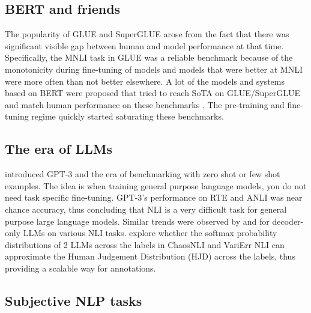\subsection{BERT and friends}
\label{related:mlms}
The popularity of GLUE \citep{wang2019glue} and SuperGLUE \citep{wang2019superglue} arose from the fact that there was significant visible gap between human and model performance at that time. Specifically, the MNLI task in GLUE was a reliable benchmark because of the monotonicity during fine-tuning of models and models that were better at MNLI were more often than not better elsewhere. A lot of the models and systems based on BERT \citep{devlin2019bert} were proposed that tried to reach SoTA on GLUE/SuperGLUE and match human performance on these benchmarks \citep{he2021deberta,he2021debertav3,patra2022englishcentric}. The pre-training and fine-tuning regime quickly started saturating these benchmarks.

\subsection{The era of LLMs}
\label{related:llms}
\citet{brown2020language} introduced GPT-3 and the era of benchmarking with zero shot or few shot examples. The idea is when training general purpose language models, you do not need task specific fine-tuning. GPT-3's performance on RTE and ANLI was near chance accuracy, thus concluding that NLI is a very difficult task for general purpose large language models. Similar trends were observed by \citet{ohmer2024form} and \citet{weber-etal-2023-mind} for decoder-only LLMs on various NLI tasks. \citet{chen2024seeingbig} explore whether the softmax probability distributions of 2 LLMs across the labels in ChaosNLI \citep{nie-etal-2020-learn} and VariErr NLI \citep{weber-genzel-etal-2024-varierr} can approximate the Human Judgement Distribution (HJD) across the labels, thus providing a scalable way for annotations.

\subsection{Subjective NLP tasks}
\label{related:subjective}

